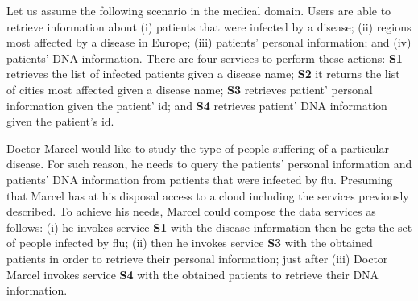 %

Let us assume the following scenario in the medical domain. Users are able to retrieve information about (i) patients that were infected by a disease; (ii) regions most affected by a disease in Europe; (iii) patients' personal information; and 
(iv) patients' DNA information. There are four services to perform these actions: \textbf{S1} retrieves the list
of infected patients given a disease name; \textbf{S2} it returns the list of cities most affected given a disease name; \textbf{S3} retrieves patient' personal information given the patient' id; and \textbf{S4} retrieves patient' DNA information given the patient's id.


Doctor Marcel would like to study the type of people suffering of a particular disease. For such reason, he needs to query the patients' personal information and patients' DNA information from patients that were infected by flu. Presuming that Marcel has at his disposal access to a cloud including the services previously described. To achieve his needs, Marcel could compose the data services as follows: (i) he invokes service \textbf{S1} with the disease information then he gets the set of people infected by flu; (ii) then he invokes service \textbf{S3} with the obtained patients in order to retrieve their personal information; just after (iii) Doctor Marcel invokes service \textbf{S4} with the obtained patients to retrieve their DNA information.



